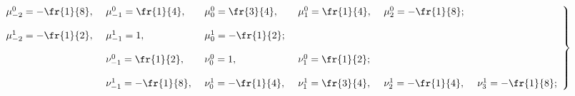 { %

\begin{equation}

\left.

{\begin{array}{llllll}

\mu_{-2}^0=-\fr{1}{8},&\ \mu_{-1}^0=\fr{1}{4},&\ \mu_{0}^0=\fr{3}{4},&\ \mu_{1}^0=\fr{1}{4},

&\ \mu_{2}^0=-\fr{1}{8}; &\ \\[12pt]

\mu_{-2}^1=-\fr{1}{2},&\ \mu_{-1}^1=1,&\ \mu_{0}^1=-\fr{1}{2}; &\ &\ &\ \\[12pt]

&\ \nu_{-1}^0=\fr{1}{2},&\ \nu_{0}^0=1,&\ \nu_{1}^0=\fr{1}{2}; &\ &\ \\[12pt]

&\ \nu_{-1}^1=-\fr{1}{8},&\ \nu_{0}^1=-\fr{1}{4},&\ \nu_{1}^1=\fr{3}{4},&\ \nu_{2}^1=-\fr{1}{4},&\

\nu_{3}^1=-\fr{1}{8};

\end{array}}

\right\}\!\!\!

\label{eq36}

\end{equation}



}




